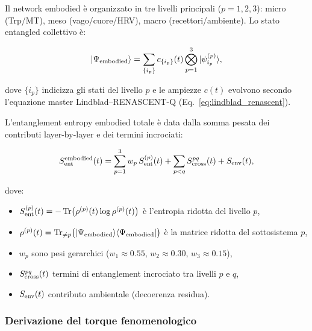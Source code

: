 \documentclass[11pt,a4paper]{article}
\let\oldref\ref
\renewcommand{\ref}{\protect\oldref}
\theoremstyle{plain}
\theoremstyle{definition}
\begin{document}
Il network embodied è organizzato in tre livelli principali ($p=1,2,3$): micro (Trp/MT), meso (vago/cuore/HRV), macro (recettori/ambiente). Lo stato entangled collettivo è:

\begin{equation}
|\Psi_{\rm embodied}\rangle = \sum_{\{i_p\}} c_{\{i_p\}}(t) \bigotimes_{p=1}^3 |\psi_{i_p}^{(p)}\rangle,
\label{eq:state_gerarchico}
\end{equation}

dove $\{i_p\}$ indicizza gli stati del livello $p$ e le ampiezze $c(t)$ evolvono secondo l'equazione master Lindblad–RENASCENT-Q (Eq.~\ref{eq:lindblad_renascent}).



\vspace{0.2cm}

L'entanglement entropy embodied totale è data dalla somma pesata dei contributi layer-by-layer e dei termini incrociati:

\begin{equation}
S_{\rm ent}^{\rm embodied}(t) = \sum_{p=1}^3 w_p \, S_{\rm ent}^{(p)}(t) + \sum_{p<q} S_{\rm cross}^{pq}(t) + S_{\rm env}(t),
\label{eq:sent_gerarchica_dettagliata}
\end{equation}

dove:
\begin{itemize}
    \item $S_{\rm ent}^{(p)}(t) = -\operatorname{Tr} \bigl( \rho^{(p)}(t) \log \rho^{(p)}(t) \bigr)$ è l'entropia ridotta del livello $p$,
    \item $\rho^{(p)}(t) = \operatorname{Tr}_{\neq p} \bigl( |\Psi_{\rm embodied}\rangle\langle\Psi_{\rm embodied}| \bigr)$ è la matrice ridotta del sottosistema $p$,
    \item $w_p$ sono pesi gerarchici ($w_1 \approx 0.55$, $w_2 \approx 0.30$, $w_3 \approx 0.15$),
    \item $S_{\rm cross}^{pq}(t)$ termini di entanglement incrociato tra livelli $p$ e $q$,
    \item $S_{\rm env}(t)$ contributo ambientale (decoerenza residua).
\end{itemize}



\vspace{0.3cm}

\subsubsection{Derivazione del torque fenomenologico}
\end{document}
